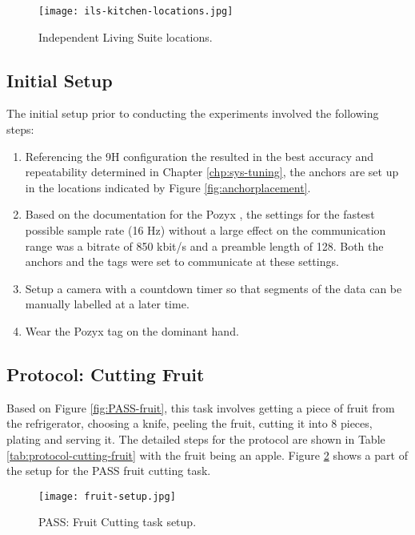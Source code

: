 \begin{figure}[ht]
    \centering
    \texttt{[image: ils-kitchen-locations.jpg]}
    \caption{Independent Living Suite locations.}
    \label{fig:ils-item-locs}
\end{figure}


\subsection{Initial Setup}
The initial setup prior to conducting the experiments involved the following steps:

\begin{enumerate}
    \item Referencing the 9H configuration the resulted in the best accuracy and repeatability determined in Chapter \ref{chp:sys-tuning}, the anchors are set up in the locations indicated by Figure \ref{fig:anchorplacement}.
    \item Based on the documentation for the Pozyx \cite{pozyx_configuration_nodate}, the settings for the fastest possible sample rate (16 Hz) without a large effect on the communication range was a bitrate of 850 kbit/s and a preamble length of 128. Both the anchors and the tags were set to communicate at these settings.
    \item Setup a camera with a countdown timer so that segments of the data can be manually labelled at a later time.
    \item Wear the Pozyx tag on the dominant hand.
\end{enumerate}

\subsection{Protocol: Cutting Fruit}
Based on Figure \ref{fig:PASS-fruit}, this task involves getting a piece of fruit from the refrigerator, choosing a knife, peeling the fruit, cutting it into 8 pieces, plating and serving it. The detailed steps for the protocol are shown in Table \ref{tab:protocol-cutting-fruit} with the fruit being an apple. Figure \ref{fig:PASS-fruit-setup} shows a part of the setup for the PASS fruit cutting task. 

\begin{figure}[ht]
    \centering
    \texttt{[image: fruit-setup.jpg]}
    \caption{PASS: Fruit Cutting task setup.}
    \label{fig:PASS-fruit-setup}
\end{figure}


